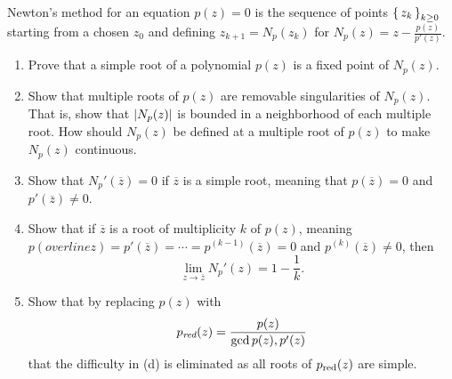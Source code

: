 \documentclass[letterpaper, 11pt, oneside]{book}
\begin{document}
\begin{exercise}\label{ex:UAG_2.1.6}
\end{exercise}

\begin{exercise}\label{ex:UAG_2.1.7}
\end{exercise}

\begin{exercise}\label{ex:UAG_2.1.8}
  Newton's method for an equation $p(z) = 0$ is the sequence of points $\set{z_{k}}_{k \geq 0}$ starting from a chosen $z_{0}$ and defining $z_{k + 1} = N_{p}(z_{k})$ for $N_{p}(z) = z - \frac{p(z)}{p'(z)}$.
  \begin{enumerate}[label= (\alph*)]
    \item Prove that a simple root of a polynomial $p(z)$ is a fixed point of $N_{p}(z)$.
    \item Show that multiple roots of $p(z)$ are removable singularities of $N_{p}(z)$.
          That is, show that $\abs{N_{p}(z)}$ is bounded in a neighborhood of each multiple root.
          How should $N_{p}(z)$ be defined at a multiple root of $p(z)$ to make $N_{p}(z)$ continuous.
    \item Show that $N_{p}'(\overline{z}) = 0$ if $\overline{z}$ is a simple root, meaning that $p(\overline{z}) = 0$ and $p'(\overline{z}) \neq 0$.
    \item Show that if $\overline{z}$ is a root of multiplicity $k$ of $p(z)$, meaning $p(overline{z}) = p'(\overline{z}) = \cdots = p^{(k - 1)}(\overline{z}) = 0$ and $p^{(k)}(\overline{z}) \neq 0$, then
          \[
            \lim_{z \to \overline{z}} N_{p}'(z) = 1 - \frac{1}{k}.
          \]
    \item Show that by replacing $p(z)$ with
          \[
            p_{\emph{red}}(z) = \frac{p(z)}{\gcd{p(z), p'(z)}}
          \]
          that the difficulty in (d) is eliminated as all roots of $p_{\operatorname{red}}(z)$ are simple.
  \end{enumerate}
\end{exercise}
\clearpage
\end{document}
